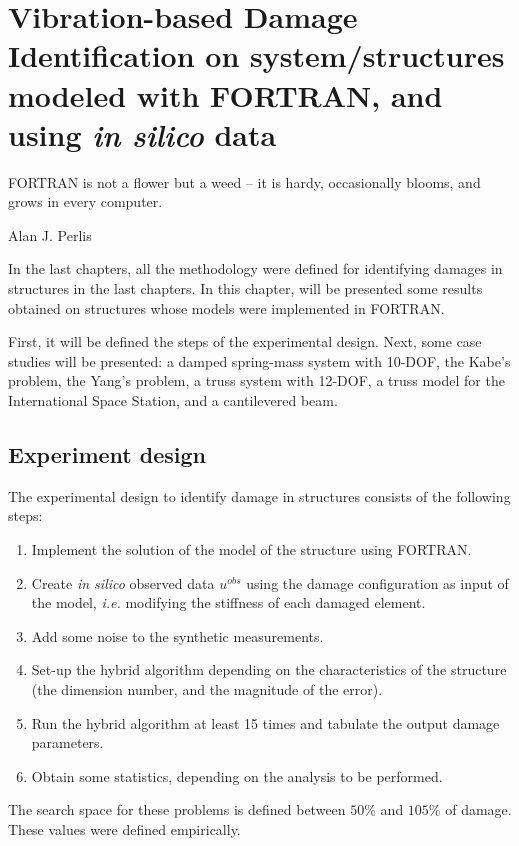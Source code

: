 \chapter{Vibration-based Damage Identification on system/structures modeled with FORTRAN, and using \textit{in silico} data}
\label{chp:7}
\epigraph{FORTRAN is not a flower but a weed -- it is hardy, occasionally blooms, and grows in every computer.}{Alan J. Perlis}

In the last chapters, all the methodology were defined for identifying damages in structures in the last chapters. In this chapter, will be presented some results obtained on structures whose models were implemented in FORTRAN.

First, it will be defined the steps of the experimental design. Next, some case studies will be presented: a damped spring-mass system with 10-DOF, the Kabe's problem, the Yang's problem, a truss system with 12-DOF, a truss model for the International Space Station, and a cantilevered beam.

\section{Experiment design}

The experimental design to identify damage in structures consists of the following steps:

\begin{enumerate}[label=(\arabic*)]
    \item Implement the solution of the model of the structure using FORTRAN.
    \item Create \textit{in silico} observed data $u^{obs}$ using the damage configuration as input of the model, \textit{i.e.} modifying the stiffness of each damaged element.
    \item Add some noise to the synthetic measurements.
    \item Set-up the hybrid algorithm depending on the characteristics of the structure (the dimension number, and the magnitude of the error).
    \item Run the hybrid algorithm at least 15 times and tabulate the output damage parameters.
    \item Obtain some statistics, depending on the analysis to be performed.
\end{enumerate}

The search space for these problems is defined between $50\%$ and $105\%$ of damage. These values were defined empirically.

